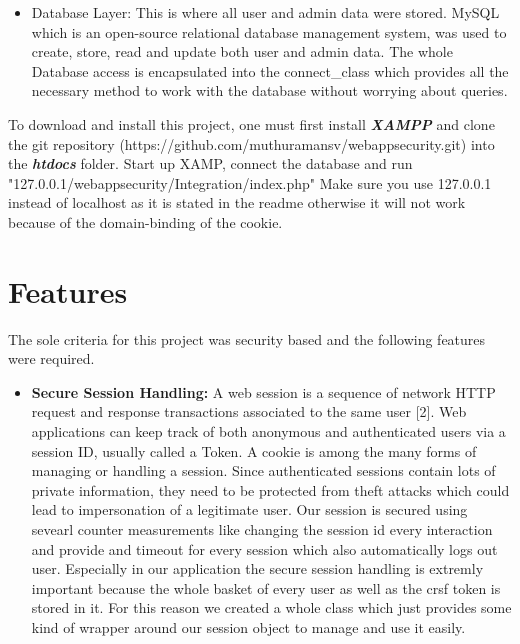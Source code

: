 \documentclass[12pt,a4paper]{article}
\begin{document}
\begin{flushleft}
\begin{itemize}
		\item Database Layer: This is where all user and admin data were stored. MySQL which is an open-source relational database management system, was used to create, store, read and update both user and admin data. The whole Database access is encapsulated into the connect\_class which provides all the necessary method to work with the database without worrying about queries.
	\end{itemize}
	
	To download and install this project, one must first install \textbf{\textit{XAMPP}} and clone the git repository (https://github.com/muthuramansv/webappsecurity.git) into the \textbf{\textit{htdocs}} folder. Start up XAMP, connect the database and run "127.0.0.1/webappsecurity/Integration/index.php" Make sure you use 127.0.0.1 instead of localhost as it is stated in the readme otherwise it will not work because of the domain-binding of the cookie.
	
	
	
	\section{Features}
	The sole criteria for this project was security based and the following features were required.
	\begin{itemize}
		\item \textbf{Secure Session Handling:} A web session is a sequence of network HTTP request and response transactions associated to the same user [2]. 
		Web applications can keep track of both anonymous and authenticated users via a session ID, usually called a Token. A cookie is among the many forms of managing or handling a session. Since authenticated sessions contain lots of private information, they need to be protected from theft attacks which could lead to impersonation of a legitimate user. Our session is secured using sevearl counter measurements like changing the session id every interaction and provide and timeout for every session which also automatically logs out user. Especially in our application the secure session handling is extremly important because the whole basket of every user as well as the crsf token is stored in it. For this reason we created a whole class which just provides some kind of wrapper around our session object to manage and use it easily.
		

\end{itemize}
\end{flushleft}
\end{document}
